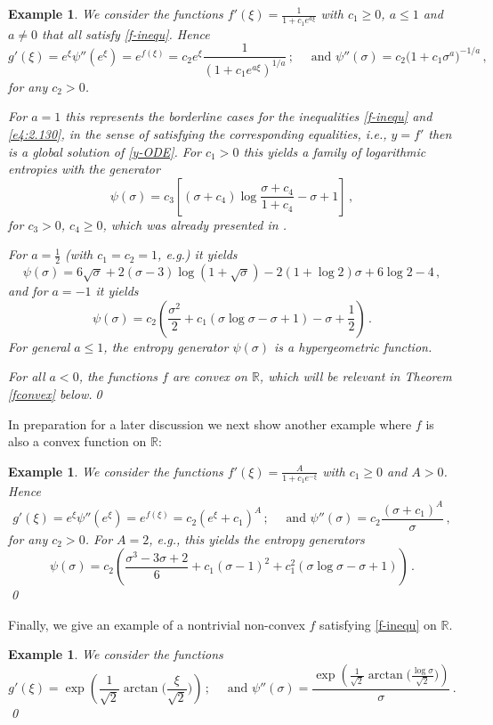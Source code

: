 \documentclass[reqno]{amsart}
\newtheorem{example}[lemma]{Example}
\newcommand{\R}{\mathbb{R}}
\begin{document}
\begin{example}
We consider the functions $f'(\xi)=\frac1{1+c_1e^{a\xi}}$ with $c_1\ge0$, $a\le1$ and $a\ne0$ that all satisfy \eqref{f-inequ}. Hence 
$$
  g'(\xi)=e^\xi\psi''(e^\xi)=e^{f(\xi)}=c_2e^\xi\frac1{(1+c_1e^{a\xi})^{1/a}}\,;
  \quad\mbox{ and } \psi''(\sigma)=c_2\big(1+c_1\sigma^{a}\big)^{-1/a}\,,
$$
for any $c_2>0$. 

For $a=1$ this represents the borderline cases for the inequalities \eqref{f-inequ} and \eqref{e4:2.130}, in the sense of satisfying the corresponding equalities, i.e., $y=f'$ then is a global solution of \eqref{y-ODE}. 
For $c_1>0$ this yields a family of logarithmic entropies with the generator
$$
  \psi(\sigma)=c_3\left[(\sigma+c_4) \log\frac{\sigma+c_4}{1+c_4}-\sigma+1\right]\,,
$$
for $c_3>0$, $c_4\ge0$, which was already presented in \cite{AMTU}.

For $a=\frac12$ (with $c_1=c_2=1$, e.g.) it yields
$$
  \psi(\sigma)=6\sqrt\sigma + 2(\sigma-3)\log(1+\sqrt \sigma)-2(1+\log2)\sigma+6\log2-4\,,
$$
and for $a=-1$ it yields
$$
  \psi(\sigma)=c_2\left(\frac{\sigma^2}{2} + c_1(\sigma\log\sigma-\sigma+1)-\sigma+\frac12\right)\,.
$$
For general $a\le1$, the entropy generator $\psi(\sigma)$ is a hypergeometric function.

For all $a<0$, the functions $f$ are convex on $\R$, which will be relevant in Theorem \ref{fconvex} below.\qed
\end{example}

In preparation for a later discussion we next show another example where $f$ is also a convex function on $\R$:

\begin{example}
We consider the functions $f'(\xi)=\frac{A}{1+c_1e^{-\xi}}$ with $c_1\ge0$ and $A>0$. Hence 
\[
  g'(\xi)=e^\xi\psi''(e^\xi)=e^{f(\xi)}=c_2(e^\xi+c_1)^A\,;
  \quad\mbox{ and } \psi''(\sigma)=c_2\frac{(\sigma+c_1)^A}{\sigma}\,,
\]
for any $c_2>0$.
For $A=2$, e.g., this yields the entropy generators
\[
  \psi(\sigma)=c_2\left(\frac{\sigma^3-3\sigma+2}{6}+c_1(\sigma-1)^2+c_1^2(\sigma\log\sigma-\sigma+1)
  \right)\,.
\]
\qed
\end{example}

Finally, we give an example of a nontrivial non-convex $f$ satisfying \eqref{f-inequ} on $\R$.

\begin{example}
We consider the functions
\[
  g'(\xi)=\exp\left(\frac{1}{\sqrt2}\arctan\big(\frac{\xi}{\sqrt2}\big)\right)\,;\quad\mbox{ and } \psi''(\sigma)=\frac{\exp\left(\frac{1}{\sqrt2}\arctan\big(\frac{\log\sigma}{\sqrt2}\big)\right)}{\sigma}\,.
\]
\qed
\end{example}
\end{document}
